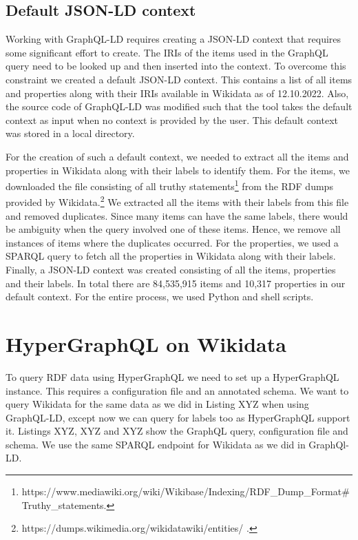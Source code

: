 \subsection{Default JSON-LD context}

Working with GraphQL-LD requires creating a JSON-LD context that requires some significant effort to create. The IRIs of the items used in the GraphQL query need to be looked up and then inserted into the context. To overcome this constraint we created a default JSON-LD context. This contains a list of all items and properties along with their IRIs available in Wikidata as of 12.10.2022. Also, the source code of GraphQL-LD was modified such that the tool takes the default context as input when no context is provided by the user. This default context was stored in a local directory.

For the creation of such a default context, we needed to extract all the items and properties in Wikidata along with their labels to identify them. For the items, we downloaded the file consisting of all truthy statements\footnote{https://www.mediawiki.org/wiki/Wikibase/Indexing/RDF\_Dump\_Format\#Truthy\_statements.} from the RDF dumps provided by Wikidata.\footnote{https://dumps.wikimedia.org/wikidatawiki/entities/ .} We extracted all the items with their labels from this file and removed duplicates. Since many items can have the same labels, there would be ambiguity when the query involved one of these items. Hence, we remove all instances of items where the duplicates occurred. For the properties, we used a SPARQL query to fetch all the properties in Wikidata along with their labels. Finally, a JSON-LD context was created consisting of all the items, properties and their labels. In total there are 84,535,915 items and 10,317 properties in our default context. For the entire process, we used Python and shell scripts.

\section{HyperGraphQL on Wikidata}

To query RDF data using HyperGraphQL we need to set up a HyperGraphQL instance. This requires a configuration file and an annotated schema. We want to query Wikidata for the same data as we did in Listing XYZ when using GraphQL-LD, except now we can query for labels too as HyperGraphQL support it. Listings XYZ, XYZ and XYZ show the GraphQL query, configuration file and schema. We use the same SPARQL endpoint for Wikidata as we did in GraphQl-LD.

